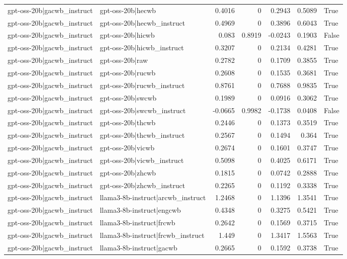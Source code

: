 \begin{table}
\begin{tabular}{l l r r r r l}
gpt-oss-20b|gacwb_instruct & gpt-oss-20b|hecwb & 0.4016 & 0 & 0.2943 & 0.5089 & True \\
gpt-oss-20b|gacwb_instruct & gpt-oss-20b|hecwb_instruct & 0.4969 & 0 & 0.3896 & 0.6043 & True \\
gpt-oss-20b|gacwb_instruct & gpt-oss-20b|hicwb & 0.083 & 0.8919 & -0.0243 & 0.1903 & False \\
gpt-oss-20b|gacwb_instruct & gpt-oss-20b|hicwb_instruct & 0.3207 & 0 & 0.2134 & 0.4281 & True \\
gpt-oss-20b|gacwb_instruct & gpt-oss-20b|raw & 0.2782 & 0 & 0.1709 & 0.3855 & True \\
gpt-oss-20b|gacwb_instruct & gpt-oss-20b|rucwb & 0.2608 & 0 & 0.1535 & 0.3681 & True \\
gpt-oss-20b|gacwb_instruct & gpt-oss-20b|rucwb_instruct & 0.8761 & 0 & 0.7688 & 0.9835 & True \\
gpt-oss-20b|gacwb_instruct & gpt-oss-20b|swcwb & 0.1989 & 0 & 0.0916 & 0.3062 & True \\
gpt-oss-20b|gacwb_instruct & gpt-oss-20b|swcwb_instruct & -0.0665 & 0.9982 & -0.1738 & 0.0408 & False \\
gpt-oss-20b|gacwb_instruct & gpt-oss-20b|thcwb & 0.2446 & 0 & 0.1373 & 0.3519 & True \\
gpt-oss-20b|gacwb_instruct & gpt-oss-20b|thcwb_instruct & 0.2567 & 0 & 0.1494 & 0.364 & True \\
gpt-oss-20b|gacwb_instruct & gpt-oss-20b|vicwb & 0.2674 & 0 & 0.1601 & 0.3747 & True \\
gpt-oss-20b|gacwb_instruct & gpt-oss-20b|vicwb_instruct & 0.5098 & 0 & 0.4025 & 0.6171 & True \\
gpt-oss-20b|gacwb_instruct & gpt-oss-20b|zhcwb & 0.1815 & 0 & 0.0742 & 0.2888 & True \\
gpt-oss-20b|gacwb_instruct & gpt-oss-20b|zhcwb_instruct & 0.2265 & 0 & 0.1192 & 0.3338 & True \\
gpt-oss-20b|gacwb_instruct & llama3-8b-instruct|arcwb_instruct & 1.2468 & 0 & 1.1396 & 1.3541 & True \\
gpt-oss-20b|gacwb_instruct & llama3-8b-instruct|engcwb & 0.4348 & 0 & 0.3275 & 0.5421 & True \\
gpt-oss-20b|gacwb_instruct & llama3-8b-instruct|frcwb & 0.2642 & 0 & 0.1569 & 0.3715 & True \\
gpt-oss-20b|gacwb_instruct & llama3-8b-instruct|frcwb_instruct & 1.449 & 0 & 1.3417 & 1.5563 & True \\
gpt-oss-20b|gacwb_instruct & llama3-8b-instruct|gacwb & 0.2665 & 0 & 0.1592 & 0.3738 & True \\

\end{tabular}
\end{table}
